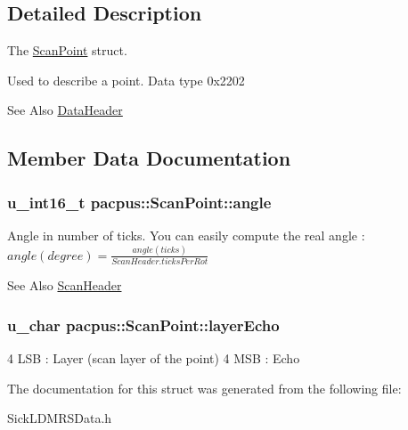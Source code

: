 \subsection{Detailed Description}
The \hyperlink{structpacpus_1_1ScanPoint}{Scan\-Point} struct. 

Used to describe a point. Data type 0x2202\begin{DoxySeeAlso}{See Also}
\hyperlink{structpacpus_1_1DataHeader}{Data\-Header} 
\end{DoxySeeAlso}


\subsection{Member Data Documentation}
\hypertarget{structpacpus_1_1ScanPoint_af551038f4f967b5289f50c9454bc8619}{
\subsubsection[{angle}]{\setlength{\rightskip}{0pt plus 5cm}u\-\_\-int16\-\_\-t pacpus\-::\-Scan\-Point\-::angle}}\label{structpacpus_1_1ScanPoint_af551038f4f967b5289f50c9454bc8619}
Angle in number of ticks. You can easily compute the real angle \-: $ angle (degree) = \frac{angle (ticks)}{ScanHeader.ticksPerRot}$\begin{DoxySeeAlso}{See Also}
\hyperlink{structpacpus_1_1ScanHeader}{Scan\-Header} 
\end{DoxySeeAlso}
\hypertarget{structpacpus_1_1ScanPoint_a300ce0213fd1a9ea59687f29b68046bc}{
\subsubsection[{layer\-Echo}]{\setlength{\rightskip}{0pt plus 5cm}u\-\_\-char pacpus\-::\-Scan\-Point\-::layer\-Echo}}\label{structpacpus_1_1ScanPoint_a300ce0213fd1a9ea59687f29b68046bc}
4 L\-S\-B \-: Layer (scan layer of the point) 4 M\-S\-B \-: Echo 

The documentation for this struct was generated from the following file\-:\begin{DoxyCompactItemize}
\item 
Sick\-L\-D\-M\-R\-S\-Data.\-h\end{DoxyCompactItemize}

